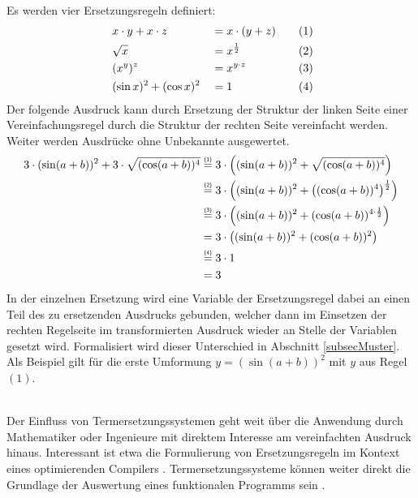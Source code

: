 \begin{beispiel}~\\
Es werden vier Ersetzungsregeln definiert:
\begin{alignat*}{4}
    ~& x \cdot y + x \cdot z   & &= x \cdot (y + z) &~~~& (1) \\
    ~& \sqrt{x}                & &= x^{\frac 1 2}   &~~~& (2) \\
    ~& (x^y)^z           & &= x^{y \cdot z}   &~~~& (3) \\
    ~& (\sin x)^2 + (\cos x)^2 & &= 1               &~~~& (4)
\end{alignat*}
Der folgende Ausdruck kann durch Ersetzung der Struktur der linken Seite einer Vereinfachungsregel durch die Struktur der rechten Seite vereinfacht werden. Weiter werden Ausdrücke ohne Unbekannte ausgewertet.
\begin{equation*}
    \begin{split}
	3 \cdot (\sin(a + b))^2 + 3 \cdot \sqrt{(\cos(a + b))^4}
	&\stapel = {(1)} 3 \cdot \paren*{(\sin(a + b))^2 + \sqrt{(\cos(a + b))^4}} \\
	&\stapel = {(2)} 3 \cdot \paren*{(\sin(a + b))^2 + \paren*{{(\cos(a + b))^4}}^{\frac 1 2}}\\
	&\stapel = {(3)} 3 \cdot \paren*{(\sin(a + b))^2 + {(\cos(a + b))^{4 \cdot \frac 1 2}}}\\
	& =              3 \cdot \paren*{(\sin(a + b))^2 + {(\cos(a + b))^2}}\\
	&\stapel = {(4)} 3 \cdot 1\\
    & = 3
    \end{split}
\end{equation*}
In der einzelnen Ersetzung wird eine Variable der Ersetzungsregel dabei an einen Teil des zu ersetzenden Ausdrucks gebunden, welcher dann im Einsetzen der rechten Regelseite im transformierten Ausdruck wieder an Stelle der Variablen gesetzt wird.
 Formalisiert wird dieser Unterschied in Abschnitt \ref{subsecMuster}. Als Beispiel gilt für die erste Umformung $y = (\sin(a + b))^2$ mit $y$ aus Regel $(1)$.
\end{beispiel}

~\\
Der Einfluss von Termersetzungssystemen geht weit über die Anwendung durch Mathematiker oder Ingenieure mit direktem Interesse am vereinfachten Ausdruck hinaus. Interessant ist etwa die Formulierung von Ersetzungsregeln im Kontext eines optimierenden Compilers \cite{HaskellCustomRewriteRules, HaskellCoreOptimizer}. Termersetzungssysteme können weiter direkt die Grundlage der Auswertung eines funktionalen Programms sein \cite{Jones1987JanRewritingMiranda}.


